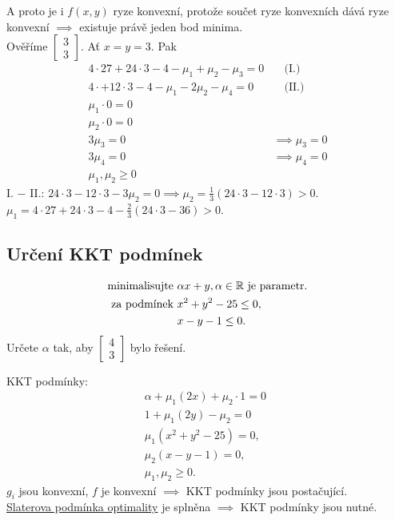 A proto je i $f(x, y)$ ryze konvexní, protože součet ryze konvexních dává ryze konvexní $\implies$ existuje právě jeden 
bod minima.\\
Ověříme $\begin{bmatrix} 3 \\ 3 \end{bmatrix}$. Ať $x=y=3$. Pak
\begin{align*}
    4 \cdot 27 + 24 \cdot 3 - 4 - \mu_1 + \mu_2 - \mu_3 = 0& \quad \text{(I.)} \\
    4 \cdot + 12 \cdot 3 - 4 - \mu_1 - 2\mu_2 - \mu_4 = 0& \quad \text{(II.)}\\
    \mu_1 \cdot 0 = 0& \\
    \mu_2 \cdot 0 = 0& \\
    3 \mu_3 = 0& \implies \mu_3 = 0\\
    3 \mu_4 = 0& \implies \mu_4 = 0\\
    \mu_1, \mu_2 \geq 0&
\end{align*}
I. $-$ II.: $24 \cdot 3 - 12 \cdot 3 - 3 \mu_2 = 0 \implies \mu_2 = \frac{1}{3} (24 \cdot 3 - 12 \cdot 3) > 0$.\\
$\mu_1 = 4 \cdot 27 + 24 \cdot 3 - 4 - \frac{2}{3}(24 \cdot 3 - 36) > 0$.

\subsection{Určení KKT podmínek}
\begin{align*}
    \text{minimalisujte } &\alpha x + y, \alpha \in \mathbb{R} \text{ je parametr.}\\
    \text{za podmínek } &x^2 + y^2 - 25 \leq 0, \\
    &x-y-1 \leq 0.
\end{align*}
Určete $\alpha$ tak, aby 
$\begin{bmatrix}
    4 \\
    3
\end{bmatrix}$ bylo řešení.

KKT podmínky:
\begin{align*}
    \alpha + \mu_1 (2x) + \mu_2 \cdot 1 = 0\phantom{,} \\
    1 + \mu_1 (2y) - \mu_2 = 0\phantom{,} \\
    \mu_1(x^2 + y^2 - 25) = 0, \\
    \mu_2(x - y - 1) = 0, \\
    \mu_1, \mu_2 \geq 0.
\end{align*}
$g_i$ jsou konvexní, $f$ je konvexní $\implies$ KKT podmínky jsou postačující.\\
\hyperref[slaterPodm]{Slaterova podmínka optimality} je splněna $\implies$ KKT podmínky jsou nutné.

